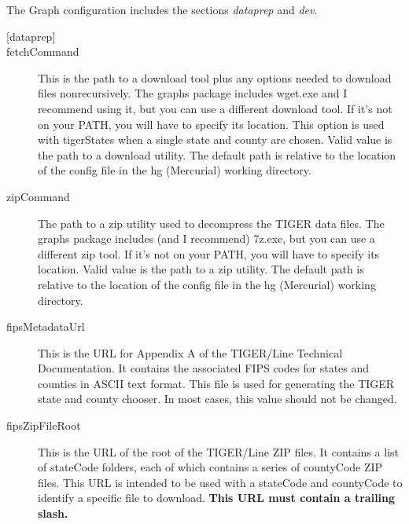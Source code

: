 \documentclass[11pt,letterpaper,onecolumn,twoside,openright,final]{report}
\begin{document}
\vspace{0.5cm}
The Graph configuration includes the sections \emph{dataprep} and \emph{dev}.
\begin{description}
\item[{[dataprep]}]
\item[fetchCommand]This is the path to a download tool plus any options needed to download files nonrecursively.
The graphs package includes wget.exe and I recommend using it, but you can use a different download tool.
If it's not on your PATH, you will have to specify its location.
This option is used with tigerStates when a single state and county are chosen.
Valid value is the path to a download utility.
The default path is relative to the location of the config file in the hg (Mercurial) working directory.

\item[zipCommand]The path to a zip utility used to decompress the TIGER data files.
The graphs package includes (and I recommend) 7z.exe, but you can use a different zip tool.
If it's not on your PATH, you will have to specify its location.
Valid value is the path to a zip utility.
The default path is relative to the location of the config file in the hg (Mercurial) working directory.

\item[fipsMetadataUrl]This is the URL for Appendix A of the TIGER/Line Technical Documentation.
It contains the associated FIPS codes for states and counties in ASCII text format.
This file is used for generating the TIGER state and county chooser.
In most cases, this value should not be changed.

\item[fipsZipFileRoot]This is the URL of the root of the TIGER/Line ZIP files.
It contains a list of stateCode folders, each of which contains a series of countyCode ZIP files.
This URL is intended to be used with a stateCode and countyCode to identify a specific file to download.
\textbf{This URL must contain a trailing slash.}


\end{description}
\end{document}
